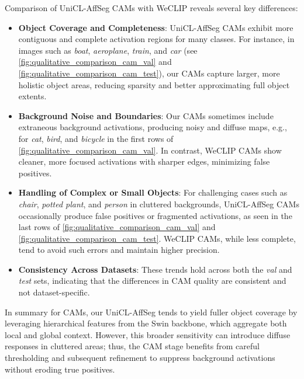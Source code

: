

Comparison of UniCL-AffSeg CAMs with WeCLIP reveals several key differences:

\begin{itemize}
    \item \textbf{Object Coverage and Completeness}: UniCL-AffSeg CAMs exhibit more contiguous and complete activation regions for many classes. For instance, in images such as \textit{boat}, \textit{aeroplane}, \textit{train}, and \textit{car} (see \autoref{fig:qualitative_comparison_cam_val} and \autoref{fig:qualitative_comparison_cam_test}), our CAMs capture larger, more holistic object areas, reducing sparsity and better approximating full object extents.
    
    \item \textbf{Background Noise and Boundaries}: Our CAMs sometimes include extraneous background activations, producing noisy and diffuse maps, e.g., for \textit{cat}, \textit{bird}, and \textit{bicycle} in the first rows of \autoref{fig:qualitative_comparison_cam_val}. In contrast, WeCLIP CAMs show cleaner, more focused activations with sharper edges, minimizing false positives. 
    
    \item \textbf{Handling of Complex or Small Objects}: For challenging cases such as \textit{chair}, \textit{potted plant}, and \textit{person} in cluttered backgrounds, UniCL-AffSeg CAMs occasionally produce false positives or fragmented activations, as seen in the last rows of \autoref{fig:qualitative_comparison_cam_val} and \autoref{fig:qualitative_comparison_cam_test}. WeCLIP CAMs, while less complete, tend to avoid such errors and maintain higher precision.
    
    \item \textbf{Consistency Across Datasets}: These trends hold across both the \textit{val} and \textit{test} sets, indicating that the differences in CAM quality are consistent and not dataset-specific.
\end{itemize}

In summary for CAMs, our UniCL-AffSeg tends to yield fuller object coverage by leveraging hierarchical features from the Swin backbone, which aggregate both local and global context. However, this broader sensitivity can introduce diffuse responses in cluttered areas; thus, the CAM stage benefits from careful thresholding and subsequent refinement to suppress background activations without eroding true positives.

